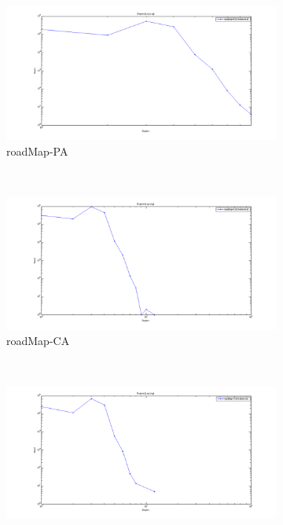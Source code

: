 \addtocounter{figure}{-1}

\begin{figure} 
    \addtocounter{figure}{1}
    \centering 
        \begin{subfigure}[htbp]{0.9\textwidth}
                \includegraphics[width=\textwidth]{FIG/dd-pa.png}
                \caption{roadMap-PA}
                \label{fig:dd-pa}
        \end{subfigure}
        ~ %
        \begin{subfigure}[htbp]{0.9\textwidth}
                \includegraphics[width=\textwidth]{FIG/dd-ca.png}
                \caption{roadMap-CA}
                \label{fig:dd-ca}
        \end{subfigure}
        ~ %
        \begin{subfigure}[htbp]{0.9\textwidth}
                \includegraphics[width=\textwidth]{FIG/dd-tx.png}

\end{subfigure}
\end{figure}
